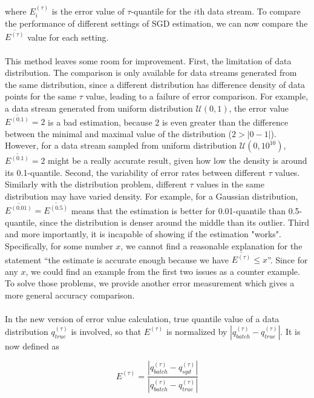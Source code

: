     
where $E^{(\tau)}_{i}$ is the error value of $\tau$-quantile for the $i$th data stream. To compare the performance of different settings of SGD estimation, we can now compare the $\overline{E^{(\tau)}}$ value for each setting.
\\\\
This method leaves some room for improvement. 
First, the limitation of data distribution. The comparison is only available for data streams generated from the same distribution, since a different distribution has difference density of data points for the same $\tau$ value, leading to a failure of error comparison. For example, a data stream generated from uniform distribution $\mathcal{U}(0,1)$, the error value $\overline{E^{(0.1)}} = 2$ is a bad estimation, because 2 is even greater than the difference between the minimal and maximal value of the distribution ($2 > |0-1|$). However, for a data stream sampled from uniform distribution $\mathcal{U}(0,10^{10})$, $\overline{E^{(0.1)}} = 2$ might be a really accurate result, given how low the density is around its 0.1-quantile. 
 Second, the variability of error rates between different $\tau$ values. Similarly with the distribution problem, different $\tau$ values in the same distribution may have varied density. For example, for a Gaussian distribution, $\overline{E^{(0.01)}} = \overline{E^{(0.5)}}$ means that the estimation is better for 0.01-quantile than 0.5-quantile, since the distribution is denser around the middle than its outlier.
 Third and more importantly, it is incapable of showing if the estimation "works". Specifically, for some number $x$, we cannot find a reasonable explanation for the statement ``the estimate is accurate enough because we have $\overline{E^{(\tau)}} \leq x$''. Since for any $x$, we could find an example from the first two issues as a counter example. To solve those problems, we provide another error measurement which gives a more general accuracy comparison.
\\\\
In the new version of error value calculation, true quantile value of a data distribution $q_{true}^{(\tau)}$ is involved, so that $E^{(\tau)}$ is normalized by $|q_{batch}^{(\tau)} - q_{true}^{(\tau)}|$. It is now defined as

\begin{equation}
    E^{(\tau)} = \frac{|q_{batch}^{(\tau)} - q_{sgd}^{(\tau)}|}
                      {|q_{batch}^{(\tau)} - q_{true}^{(\tau)}|}
\end{equation}
    

